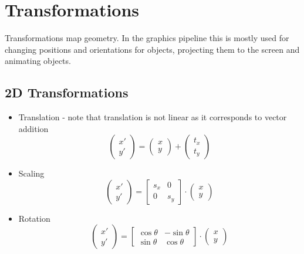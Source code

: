 \section{Transformations}

Transformations map geometry. In the graphics pipeline this is mostly used for changing positions and orientations for objects, projecting them to the screen and animating objects.

\subsection{2D Transformations}
\begin{itemize}
	\item Translation - note that translation is not linear as it corresponds to vector addition
	$$\begin{pmatrix}
		x' \\ y'
	\end{pmatrix} = \begin{pmatrix}
		x \\ y
	\end{pmatrix} + \begin{pmatrix}
		t_x \\ t_y
	\end{pmatrix}$$
	
	\item Scaling
	$$\begin{pmatrix}
		x' \\ y'
	\end{pmatrix} = \begin{bmatrix}
		s_x & 0 \\ 0 & s_y
	\end{bmatrix} \cdot \begin{pmatrix}
		x \\ y
	\end{pmatrix}$$
	
	\item Rotation
	$$\begin{pmatrix}
		x' \\ y'
	\end{pmatrix} = \begin{bmatrix}
		\cos \theta & - \sin \theta \\ \sin \theta & \cos \theta
	\end{bmatrix} \cdot \begin{pmatrix}
		x \\ y
	\end{pmatrix}$$
\end{itemize}

